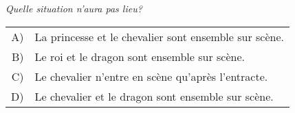 {%
{\em
Quelle situation n’aura pas lieu?


}

\begin{tabular}{ @{} r l @{} }
  A) & La princesse et le chevalier sont ensemble sur scène. \\ 
  B) & Le roi et le dragon sont ensemble sur scène. \\ 
  C) & Le chevalier n’entre en scène qu’après l’entracte. \\ 
  D) & Le chevalier et le dragon sont ensemble sur scène.
\end{tabular}



}
